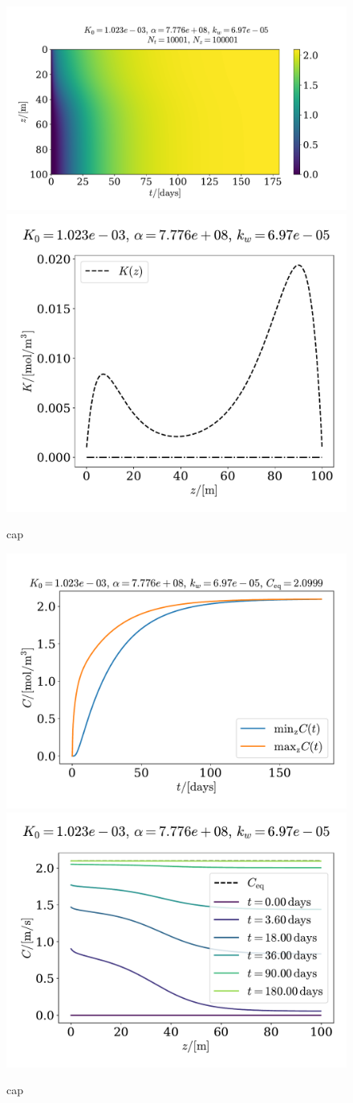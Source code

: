 \documentclass{article}
\begin{document}
    \begin{figure}[h]
        \centering
        \includegraphics[width=.65\textwidth]{../plots/prob2}
        \includegraphics[width=.3\textwidth]{../plots/prob2_K}
        \caption{cap}
        \label{prob2}
    \end{figure}

    \begin{figure}[h]
        \centering
        \includegraphics[width=.47\textwidth]{../plots/prob2_minmax}
        \includegraphics[width=.52\textwidth]{../plots/prob2_i}
        \caption{cap}
        \label{prob2 minmax}
    \end{figure}
\end{document}
